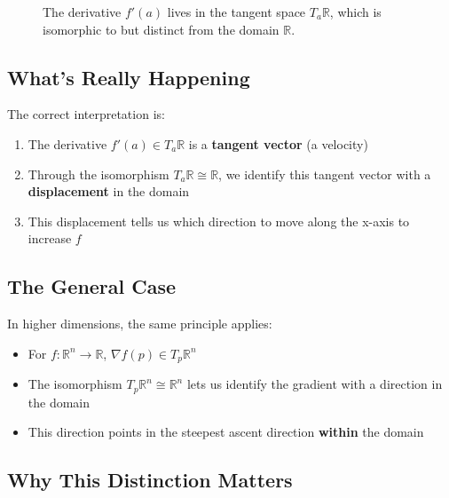 \begin{notechapter}
\begin{figure}[h]
\caption{The derivative $f'(a)$ lives in the tangent space $T_a\mathbb{R}$, which is isomorphic to but distinct from the domain $\mathbb{R}$.}
\end{figure}

\subsection{What's Really Happening}

The correct interpretation is:

\begin{enumerate}
\item The derivative $f'(a) \in T_a\mathbb{R}$ is a \textbf{tangent vector} (a velocity)
\item Through the isomorphism $T_a\mathbb{R} \cong \mathbb{R}$, we identify this tangent vector with a \textbf{displacement} in the domain
\item This displacement tells us which direction to move along the x-axis to increase $f$
\end{enumerate}

\subsection{The General Case}

In higher dimensions, the same principle applies:

\begin{itemize}
\item For $f: \mathbb{R}^n \to \mathbb{R}$, $\nabla f(p) \in T_p\mathbb{R}^n$
\item The isomorphism $T_p\mathbb{R}^n \cong \mathbb{R}^n$ lets us identify the gradient with a direction in the domain
\item This direction points in the steepest ascent direction \textbf{within} the domain
\end{itemize}

\subsection{Why This Distinction Matters}


\end{notechapter}
